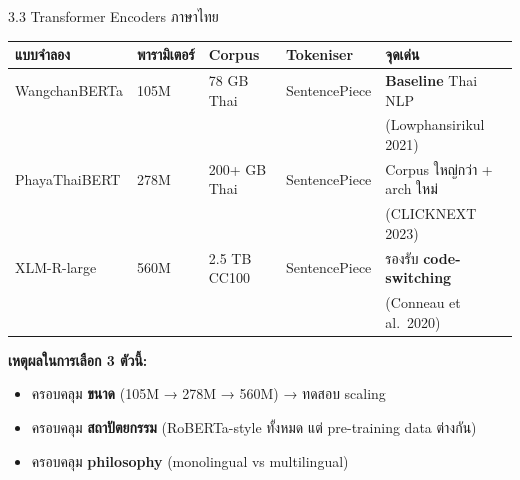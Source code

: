 \documentclass[aspectratio=169,11pt,xcolor=dvipsnames]{beamer}
\newcommand{\hl}[1]{\textcolor{kmitlOrange}{\textbf{#1}}}
\newcommand{\hlb}[1]{\textcolor{kmitlBlue}{\textbf{#1}}}
\begin{document}
\begin{frame}{3.3 Transformer Encoders ภาษาไทย}
  \footnotesize
  \begin{tabular}{p{2.6cm}p{1.6cm}p{1.8cm}p{1.8cm}p{4.5cm}}
    \toprule
    \textbf{แบบจำลอง} & \textbf{พารามิเตอร์} & \textbf{Corpus} & \textbf{Tokeniser} & \textbf{จุดเด่น}\\
    \midrule
    WangchanBERTa & 105M & 78 GB Thai & SentencePiece & \hlb{Baseline} Thai NLP\\
                  &      &            &               & (Lowphansirikul 2021)\\[0.3em]
    PhayaThaiBERT & 278M & 200+ GB Thai & SentencePiece & Corpus ใหญ่กว่า + arch ใหม่\\
                  &      &              &               & (CLICKNEXT 2023)\\[0.3em]
    XLM-R-large   & 560M & 2.5 TB CC100 & SentencePiece & รองรับ \hl{code-switching}\\
                  &      &              &               & (Conneau et al.\ 2020)\\
    \bottomrule
  \end{tabular}
  \vspace{0.6em}

  \textbf{เหตุผลในการเลือก 3 ตัวนี้:}
  \begin{itemize}
    \item ครอบคลุม \hl{ขนาด} (105M → 278M → 560M) → ทดสอบ scaling
    \item ครอบคลุม \hl{สถาปัตยกรรม} (RoBERTa-style ทั้งหมด แต่ pre-training data ต่างกัน)
    \item ครอบคลุม \hl{philosophy} (monolingual vs multilingual)
  \end{itemize}
\end{frame}
\end{document}
